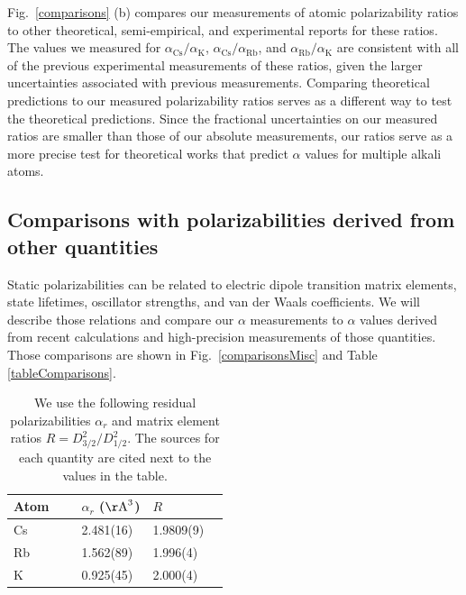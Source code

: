 \documentclass[twocolumn,pra,showpacs,superscriptaddress,longbibliography]{revtex4-1}   %
\newcommand{\figref}[1]{Fig.~\ref{#1}}
\newcommand{\ak}{\alpha_{\textrm{K}}}
\newcommand{\arb}{\alpha_{\textrm{Rb}}}
\newcommand{\acs}{\alpha_{\textrm{Cs}}}
\newcommand{\AAA}{\mathrm{\AA}}
\begin{document}
\figref{comparisons} (b) compares our measurements of atomic polarizability ratios to other theoretical, semi-empirical, and experimental reports for these ratios.  The values we measured for $\acs/\ak$, $\acs/\arb$, and $\arb/\ak$ are consistent with all of the previous experimental measurements of these ratios, given the larger uncertainties associated with previous measurements.  Comparing theoretical predictions to our measured polarizability ratios serves as a different way to test the theoretical predictions.  Since the fractional uncertainties on our measured ratios are smaller than those of our absolute measurements, our ratios serve as a more precise test for theoretical works that predict $\alpha$ values for multiple alkali atoms.  




\subsection{Comparisons with polarizabilities derived from other quantities} \label{sectionComparisonsWithDerived}

Static polarizabilities can be related to electric dipole transition matrix elements, state lifetimes, oscillator strengths, and van der Waals coefficients. We will describe those relations and compare our $\alpha$ measurements to $\alpha$ values derived from recent calculations and high-precision measurements of those quantities. Those comparisons are shown in \figref{comparisonsMisc} and Table \ref{tableComparisons}.

\begingroup
\begin{table}
\caption{\label{tableOmegaRes}We use the following residual polarizabilities $\alpha_r$ and matrix element ratios $R = D_{3/2}^2/D_{1/2}^2$.
The sources for each quantity are cited next to the values in the table.}
\begin{center}
\begin{tabular}{llll}
\hline\hline
Atom$\quad$~ & $\alpha_r$ ($\AAA^3$) \quad\quad\quad\quad\quad & $R$ \\
\hline
Cs & 2.481(16) \cite{Derevianko2001} & 1.9809(9) & \cite{Rafac1998} \\
Rb & 1.562(89) \cite{Safronova2006} & 1.996(4) & \cite{Volz2006} \\ %
K  & 0.925(45) \cite{Safronova2006} & 2.000(4) & \cite{Holmgren2012} \\
\hline\hline
\end{tabular}
\end{center}
\end{table}
\endgroup
\end{document}
